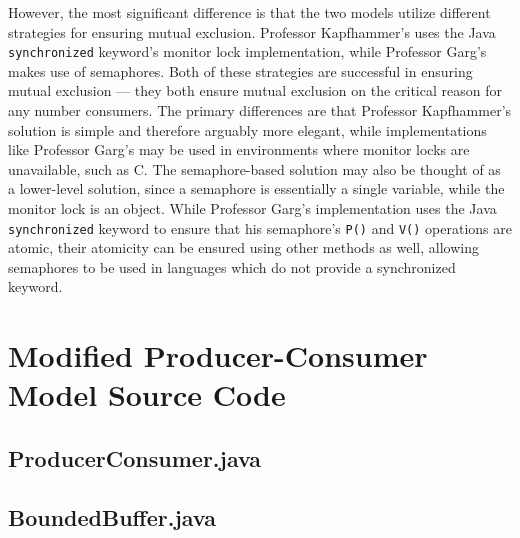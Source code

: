 \documentclass[12pt,a4paper]{article}
\begin{document}
		However, the most significant difference is that the two models utilize different strategies for ensuring mutual exclusion. Professor Kapfhammer's uses the Java \texttt{synchronized} keyword's monitor lock implementation, while Professor Garg's makes use of semaphores. Both of these strategies are successful in ensuring mutual exclusion --- they both ensure mutual exclusion on the critical reason for any number consumers. The primary differences are that Professor Kapfhammer's solution is simple and therefore arguably more elegant, while implementations like Professor Garg's may be used in environments where monitor locks are unavailable, such as C. The semaphore-based solution may also be thought of as a lower-level solution, since a semaphore is essentially a single variable, while the monitor lock is an object. While Professor Garg's implementation uses the Java \texttt{synchronized} keyword to ensure that his semaphore's \texttt{P()} and \texttt{V()} operations are atomic, their atomicity can be ensured using other methods as well, allowing semaphores to be used in languages which do not provide a synchronized keyword.

  	\appendix
  		\section{Modified Producer-Consumer Model Source Code}
  			\label{ap:source}
  			\subsection{ProducerConsumer.java}
  				
  			\subsection{BoundedBuffer.java}
  				
\end{document}
